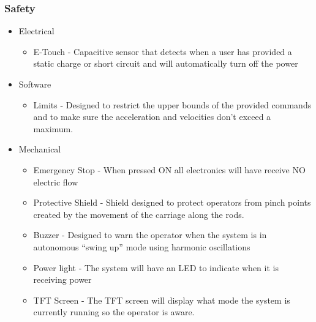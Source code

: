 \documentclass[aspectratio=169]{beamer}
\begin{document}
\begin{frame}
    \frametitle{Safety}

    \begin{itemize}
     \item Electrical
        \begin{itemize}
         \item E-Touch - Capacitive sensor that detects when a user has provided a static charge or short circuit and will automatically turn off the power
        \end{itemize}

    \item Software
        \begin{itemize}
         \item Limits -  Designed to restrict the upper bounds of the provided commands and to make sure the acceleration and velocities don't exceed a maximum.
        \end{itemize}

    \item Mechanical
        \begin{itemize}
            \item Emergency Stop - When pressed ON all electronics will have receive NO electric flow
            \item Protective Shield - Shield designed to protect operators from pinch points created by the movement of the carriage along the rods.
            \item Buzzer - Designed to warn the operator when the system is in autonomous “swing up” mode using harmonic oscillations
            \item Power light - The system will have an LED to indicate when it is receiving power
            \item TFT Screen - The TFT screen will display what mode the system is currently running so the operator is aware.
        \end{itemize}
    \end{itemize}

\end{frame}
\end{document}
